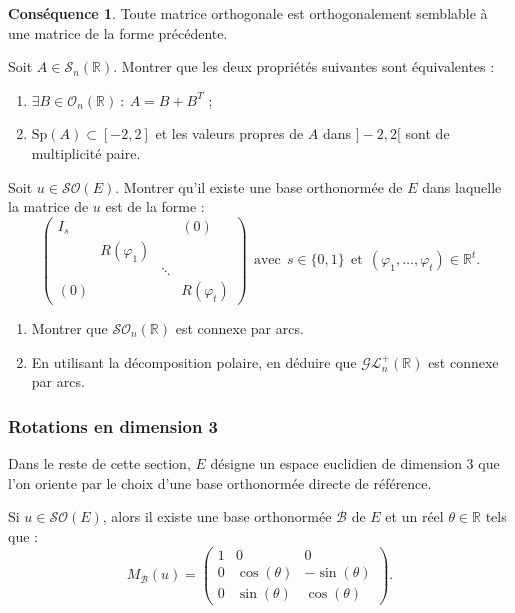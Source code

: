 \documentclass[french]{article}
\newcommand{\R}{\mathbb{R}}
\theoremstyle{plain}
\theoremstyle{definition}
\newtheorem*{conséquence}{Conséquence}
\theoremstyle{remark}
\begin{document}
\begin{conséquence}
	Toute matrice orthogonale est orthogonalement semblable à une matrice de la forme précédente.
\end{conséquence}

\begin{exo}
	Soit $A\in\mathcal{S}_n(\R)$. Montrer que les deux propriétés suivantes sont équivalentes : 
	\begin{enumerate}[label=(\roman*)]
		\item $\exists B\in\mathcal{O}_n(\R)\ : \ A=B+B^T$ ;
		\item $\text{Sp}(A)\subset[-2,2]$ et les valeurs propres de $A$ dans $]-2,2[$ sont de multiplicité paire.
	\end{enumerate}
\end{exo}

\begin{exo}
	Soit $u\in\mathcal{SO}(E)$. Montrer qu'il existe une base orthonormée de $E$ dans laquelle la matrice de $u$ est de la forme : $$\begin{pmatrix}
		I_s&&&(0)\\
		&R(\varphi_1)&&\\
		&&\ddots&\\
		(0)&&&R(\varphi_t)
	\end{pmatrix}\ \ \text{avec}\ \ s\in\{0,1\}\ \ \text{et}\ \ (\varphi_1,\ldots,\varphi_t)\in\R^t.$$
\end{exo}

\begin{exo}
	\begin{enumerate}
		\item Montrer que $\mathcal{SO}_n(\R)$ est connexe par arcs. 
		\item En utilisant la décomposition polaire, en déduire que $\mathcal{GL}_n^+(\R)$ est connexe par arcs.
	\end{enumerate}
\end{exo}

\subsubsection*{Rotations en dimension 3}
Dans le reste de cette section, $E$ désigne un espace euclidien de dimension $3$ que l'on oriente par le choix d'une base orthonormée directe de référence.

\begin{prop}
	Si $u\in\mathcal{SO}(E)$, alors il existe une base orthonormée $\mathcal{B}$ de $E$ et un réel $\theta\in\R$ tels que : $$M_\mathcal{B}(u)=\begin{pmatrix}
		1&0&0\\
		0&\cos(\theta)&-\sin(\theta)\\
		0&\sin(\theta)&\cos(\theta)
	\end{pmatrix}.$$
\end{prop}
\end{document}

